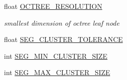 \begin{DoxyCompactItemize}
float \hyperlink{classdatmo_1_1cloud__segmentation_aba086f9f8e05f18c02c042c057854a06}{O\+C\+T\+R\+E\+E\+\_\+\+R\+E\+S\+O\+L\+U\+T\+I\+ON}
\begin{DoxyCompactList}\small\item\em smallest dimension of octree leaf node \end{DoxyCompactList}\item 
float \hyperlink{classdatmo_1_1cloud__segmentation_af33add7f3b00fac5be10ffd87eae057f}{S\+E\+G\+\_\+\+C\+L\+U\+S\+T\+E\+R\+\_\+\+T\+O\+L\+E\+R\+A\+N\+CE}
\item 
int \hyperlink{classdatmo_1_1cloud__segmentation_acf7cfcaf0ab08a2afffcc2b47048bc81}{S\+E\+G\+\_\+\+M\+I\+N\+\_\+\+C\+L\+U\+S\+T\+E\+R\+\_\+\+S\+I\+ZE}
\item 
int \hyperlink{classdatmo_1_1cloud__segmentation_ab2959ad226faeaab4910f42ba91d37cb}{S\+E\+G\+\_\+\+M\+A\+X\+\_\+\+C\+L\+U\+S\+T\+E\+R\+\_\+\+S\+I\+ZE}
\end{DoxyCompactItemize}
